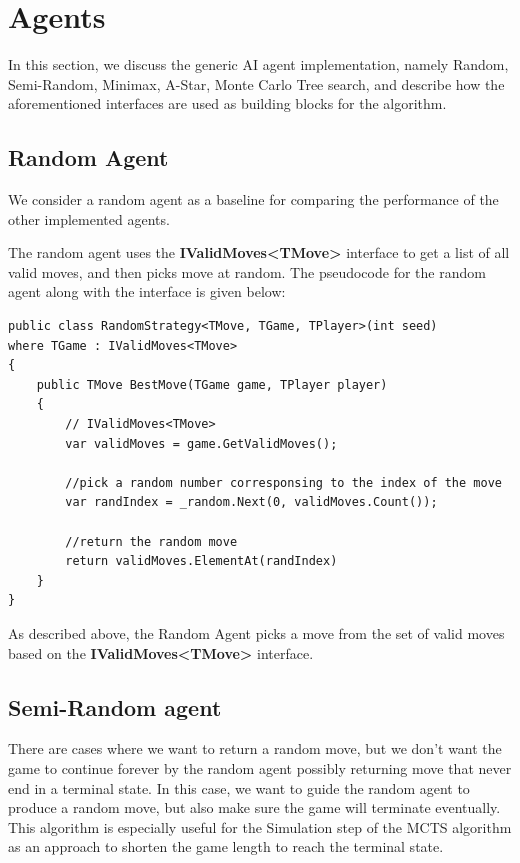 \section{Agents}

In this section, we discuss the generic \ac{AI} agent implementation, namely Random, Semi-Random, Minimax, A-Star, Monte Carlo Tree search, and describe how the aforementioned interfaces are used as building blocks for the algorithm.

\subsection{Random Agent}
We consider a random agent as a baseline for comparing the performance of the other implemented agents. 

The random agent uses the \textbf{IValidMoves\textless{}TMove\textgreater{}} interface to get a list of all valid moves, and then picks move at random. The pseudocode for the random agent along with the interface is given below:

\begin{lstlisting}
public class RandomStrategy<TMove, TGame, TPlayer>(int seed)
where TGame : IValidMoves<TMove>
{    
    public TMove BestMove(TGame game, TPlayer player)
    {
        // IValidMoves<TMove>
        var validMoves = game.GetValidMoves();

        //pick a random number corresponsing to the index of the move
        var randIndex = _random.Next(0, validMoves.Count());

        //return the random move
        return validMoves.ElementAt(randIndex)
    }
}
\end{lstlisting}

As described above, the Random Agent picks a move from the set of valid moves based on the \textbf{IValidMoves\textless{}TMove\textgreater{}} interface.

\subsection{Semi-Random agent}

There are cases where we want to return a random move, but we don't want the game to continue forever by the random agent possibly returning move that never end in a terminal state. In this case, we want to guide the random agent to produce a random move, but also make sure the game will terminate eventually. This algorithm is especially useful for the Simulation step of the \ac{MCTS} algorithm as an approach to shorten the game length to reach the terminal state.

